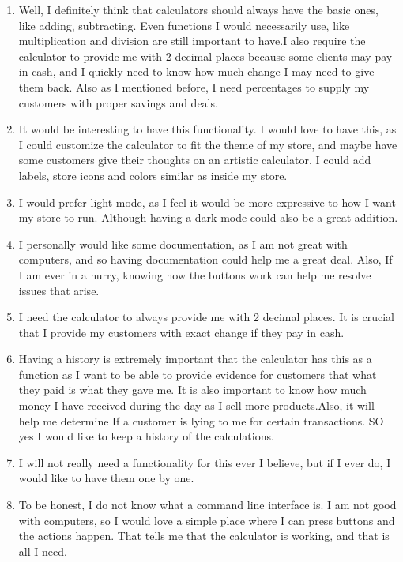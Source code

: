 \documentclass[titlepage]{article}
\begin{document}
\begin{itemize}
\begin{enumerate}
                            \item Well, I definitely think that calculators should always have the basic ones, like adding, subtracting. Even functions I would necessarily use, like multiplication and division are still important to have.I also require the calculator to provide me with 2 decimal places because some clients may pay in cash, and I quickly need to know how much change I may need to give them back. Also as I mentioned before, I need percentages to supply my customers with proper savings and deals.
                            \item It would be interesting to have this functionality. I would love to have this, as I could customize the calculator to fit the theme of my store, and maybe have some customers give their thoughts on an artistic calculator. I could add labels, store icons and colors similar as inside my store.
                            \item I would prefer light mode, as I feel it would be more expressive to how I want my store to run. Although having a dark mode could also be a great addition.
                            \item I personally would like some documentation, as I am not great with computers, and so having documentation could help me a great deal. Also, If I am ever in a hurry, knowing how the buttons work can help me resolve issues that arise.
                            \item I need the calculator to always provide me with 2 decimal places. It is crucial that I provide my customers with exact change if they pay in cash.
                            \item Having a history is extremely important that the calculator has this as a function as I want to be able to provide evidence for customers that what they paid is what they gave me. It is also important to know how much money I have received during the day as I sell more products.Also, it will help me determine If a customer is lying to me for certain transactions. SO yes I would like to keep a history of the calculations.
                            \item I will not really need a functionality for this ever I believe, but if I ever do, I would like to have them one by one.
                            \item To be honest, I do not know what a command line interface is. I am not good with computers, so I would love a simple place where I can press buttons and the actions happen. That tells me that the calculator is working, and that is all I need.

\end{enumerate}
\end{itemize}
\end{document}
